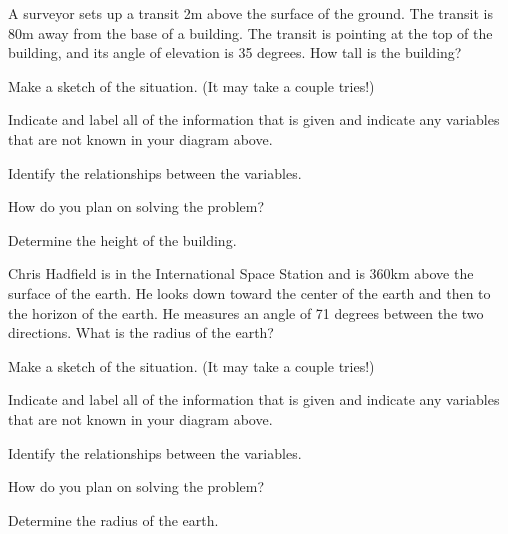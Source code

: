 \begin{problem}
\item A surveyor sets up a transit 2m above the surface of the
  ground. The transit is 80m away from the base of a building.
  The transit is pointing at the top of the building,
  and its angle of elevation is 35 degrees. How tall is the building?
  \begin{subproblem}
  \item Make a sketch of the situation. (It may take a couple tries!)
    \vfill
    \vfill
  \item Indicate and label all of the information that is given and
    indicate any variables that are not known in your diagram above.
  \item Identify the relationships between the variables.
    \vfill
    \vfill
  \item How do you plan on solving the problem?
    \vfill
  \item Determine the height of the building.
    \vfill
    \vfill
  \end{subproblem}

\clearpage

\item Chris Hadfield is in the International Space Station and is
  360km above the surface of the earth. He looks down toward the
  center of the earth and then to the horizon of the earth. He
  measures an angle of 71 degrees between the two directions. What is
  the radius of the earth?
  \begin{subproblem}
  \item Make a sketch of the situation. (It may take a couple tries!)
    \vfill
  \item Indicate and label all of the information that is given and
    indicate any variables that are not known in your diagram above.
  \item Identify the relationships between the variables.
    \vfill
    \vfill
  \item How do you plan on solving the problem?
    \vfill
  \item Determine the radius of the earth.
    \vfill
    \vfill
  \end{subproblem}

\end{problem}

\postClass


